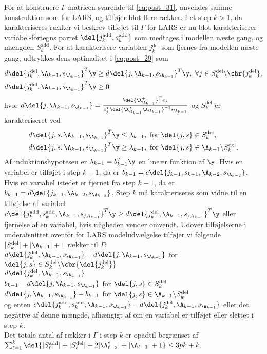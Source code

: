 For at konstruere \(\Gamma\) matricen svarende til \eqref{eq:post_31}, anvendes samme konstruktion som for LARS, og tilføjer blot flere rækker.
I et step \(k>1\), da karakteriseres rækker vi beskrev tilføjet til \(\Gamma\) for LARS er nu blot karakteriserer variabel-fortegns parret \(\del{j_k^\text{add}, s_k^\text{add}}\) som medtages i modellen næste gang, og mængden \(S_k^\text{add}\).
For at karakterisere variablen \(j_k^\text{del}\) som fjernes fra modellen næste gang, udtrykkes dens optimalitet i \eqref{eq:post_29} som
\begin{align*}
d \del{j_k^\text{del}, \A_{k-1}, s_{\A_{k-1}}}^T \y &\geq d \del{j, \A_{k-1}, s_{\A_{k-1}}}^T \y, \ \forall j \in S_k^\text{del} \backslash \cbr{j_k^\text{del}}, \\
d \del{j_k^\text{del}, \A_{k-1}, s_{\A_{k-1}}}^T \y &\geq 0
\end{align*}
hvor \(d \del{j, \A_{k-1}, s_{\A_{k-1}}} = \frac{\del{\X_{\A_{k-1}}^+}^T e_j}{e_j^T \del{\X_{\A_{k-1}}^T \X_{\A_{k-1}}}^{-1} s_{\A_{k-1}}}\) og \(S_k^\text{del}\) er karakteriseret ved
\begin{align*}
d \del{j, s, \A_{k-1}, s_{\A_{k-1}}}^T \y &\leq \lambda_{k-1}, \ \text{for } \del{j,s} \in S_k^\text{del}, \\
d \del{j, s, \A_{k-1}, s_{\A_{k-1}}}^T \y &\geq \lambda_{k-1}, \ \text{for } \del{j,s} \in \A_{k-1} \backslash S_k^\text{del}.
\end{align*}
Af induktionshypotesen er \(\lambda_{k-1}=b^T_{k-1} \y\) en lineær funktion af \(\y\).
Hvis en variabel er tilføjet i step \(k-1\), da er \(b_{k-1}=c \del{j_{k-1}, s_{k-1},\A_{k-2}, s_{\A_{k-2}}}\).
Hvis en variabel istedet er fjernet fra step \(k-1\), da er \(b_{k-1}=d \del{j_{k-1}, \A_{k-2}, s_{\A_{k-2}}}\).
Step \(k\) må karakteriseres som vidne til en tilføjelse af variabel \(c \del{j_k^\text{add}, s_k^\text{add}, \A_{k-1}, s_{/A_{k-1}}}^T \y \geq d \del{j_k^\text{del}, \A_{k-1}, s_{/A_{k-1}}}^T \y\) eller fjernelse af en variabel, hvis uligheden vender omvendt.
%
Udover tilføjelserne i underafsnittet ovenfor for LARS modeludvælgelse tilføjer vi følgende \(\vert S_k^\text{del} \vert + \vert \A_{k-1} \vert + 1\) rækker til \(\Gamma\):
\(d \del{j_k^\text{del}, \A_{k-1}, s_{\A_{k-1}}} - d \del{j, \A_{k-1}, s_{\A_{k-1}}}\) for \(\del{j,s} \in S_k^\text{del} \backslash \cbr{\del{j_k^\text{del}}}\) \\
\(d \del{j_k^\text{del}, \A_{k-1}, s_{\A_{k-1}}}\) \\
\(b_{k-1} - d \del{j, \A_{k-1}, s_{\A_{k-1}}}\) for \(\del{j,s} \in S_k^\text{del}\) \\
\(d \del{j, \A_{k-1}, s_{\A_{k-1}}} - b_{k-1}\) for \(\del{j,s} \in \A_{k-1} \backslash S_k^\text{del}\) \\
og enten \(c \del{j_k^\text{add}, s_k^\text{add}, \A_{k-1}, s_{\A_{k-1}}} - d \del{j_k^\text{del}, \A_{k-1}, s_{\A_{k-1}}}\) eller det negative af denne mængde, afhængigt af om en variabel er tilføjet eller slettet i step \(k\). \\
Det totale antal af rækker i \(\Gamma\) i step \(k\) er opadtil begrænset af \\
\(\sum_{\ell=1}^k \del{\vert S_\ell^\text{add} \vert + \vert S_\ell^\text{del} \vert + 2 \vert \A_{\ell-2}^c \vert + \vert \A_{\ell-1} \vert + 1} \leq 3 pk + k\).